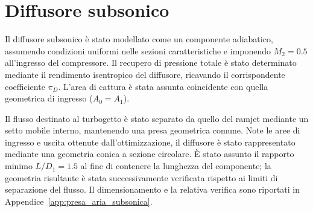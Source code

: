 \label{sec:presaAria}
\section{Diffusore subsonico}
Il diffusore subsonico è stato modellato come un componente adiabatico,
assumendo condizioni uniformi nelle sezioni caratteristiche e imponendo
$M_2=0.5$ all'ingresso del compressore. Il recupero di pressione totale è stato determinato mediante il rendimento isentropico del diffusore, ricavando il corrispondente coefficiente $\pi_D$. L'area di cattura è stata assunta coincidente con quella geometrica di ingresso ($A_0=A_1$).

Il flusso destinato al turbogetto è stato separato da quello del ramjet mediante un setto mobile interno, mantenendo una presa geometrica comune. Note le aree di ingresso e uscita ottenute dall'ottimizzazione, il diffusore è stato rappresentato mediante una geometria conica a sezione circolare. È stato assunto il rapporto minimo $L/D_1=1.5$ al fine di contenere la lunghezza del componente; la geometria risultante è stata successivamente verificata rispetto ai limiti di separazione del flusso. Il dimensionamento e la relativa verifica sono riportati in Appendice~\ref{app:presa_aria_subsonica}.



